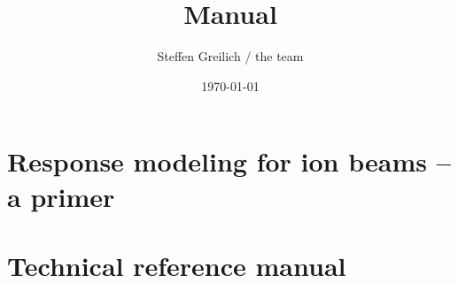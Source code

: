 \documentclass[10pt,a4paper]{book}
\title{\la{} Manual}
\author{Steffen Greilich / the \la{} team}
\date{\today}
\begin{document}
\maketitle

\tableofcontents



\part{Response modeling for ion beams -- a primer}







\part{Technical reference manual}











\end{document}
